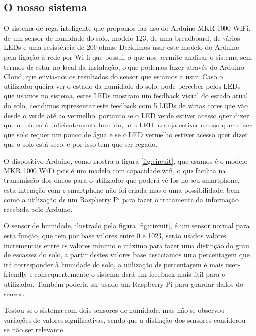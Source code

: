 \documentclass[conference]{IEEEtran}
\begin{document}
\subsection{O nosso sistema}

O sistema de rega inteligente que propomos faz uso do Arduino MKR 1000 WiFi, 
de um sensor de humidade do solo, modelo 123, de uma breadboard, de vários LEDs 
e uma resistência de 200 ohms. Decidimos usar este modelo do Arduino pela ligação 
à rede por Wi-fi que possui, o que nos permite analisar o sistema sem termos de 
estar no local da instalação, o que podemos fazer através do Arduino Cloud, 
que envia-nos os resultados do sensor que estamos a usar. Caso o utilizador 
queira ver o estado da humidade do solo, pode perceber pelos LEDs que usamos no sistema, 
estes LEDs mostram um feedback visual do estado atual do solo, decidimos representar este 
feedback com 5 LEDs de várias cores que vão desde o verde até ao vermelho, portanto 
se o LED verde estiver acesso quer dizer que o solo está suficientemente humido, se 
o LED laranja estiver acesso quer dizer que solo requer um pouco de água e se o LED
vermelho estiver acesso quer dizer que o solo está seco, e por isso tem que ser regado.

O dispositivo Arduino, como mostra a figura \ref{fig:circuit}, que usamos é o 
modelo MKR 1000 WiFi pois é um modelo com capacidade wifi, o que facilita na 
transmissão dos dados para o utilizador que poderá vê-los no seu smartphone, 
esta interação com o smartphone não foi criada mas é uma possibilidade, bem 
como a utilização de um Raspberry Pi para fazer o tratamento da informação 
recebida pelo Arduino.

O sensor de humidade, ilustrado pela figura \ref{fig:circuit}, é um 
sensor normal para esta função, que tem por base valores entre 0 e 1023, serão usados valores 
incrementais entre os valores mínimo e máximo para fazer uma distinção do grau 
de escassez do solo, a partir destes valores base associamos uma percentagem 
que irá corresponder à humidade do solo, a utilização de percentagem é 
mais user-friendly e consequentemente o sistema dará um feedback mais útil
para o utilizador. Também poderia ser usado um Raspberry Pi para guardar dados do sensor.

Testou-se o sistema com dois sensores de humidade, mas não se observou variações de valores significativas, 
sendo que a distinção dos sensores considerou-se não ser relevante.
\end{document}
